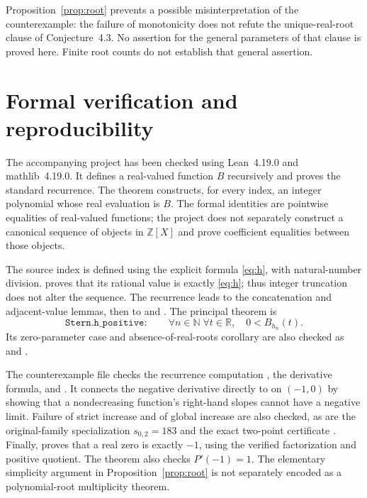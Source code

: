 \documentclass[11pt]{article}
\theoremstyle{remark}
\newcommand{\N}{\mathbb{N}}
\newcommand{\R}{\mathbb{R}}
\newcommand{\Z}{\mathbb{Z}}
\begin{document}
Proposition~\ref{prop:root} prevents a possible misinterpretation of the
counterexample: the failure of monotonicity does not refute the
unique-real-root clause of Conjecture~4.3. No assertion for the general
parameters of that clause is proved here. Finite root counts do not
establish that general assertion.

\section{Formal verification and reproducibility}
The accompanying project has been checked using Lean~4.19.0 and
mathlib~4.19.0. It defines a real-valued function $B$ recursively and
proves the standard recurrence. The theorem
 constructs, for every index,
an integer polynomial whose real evaluation is $B$.
The formal identities are pointwise equalities of real-valued functions;
the project does not separately construct a canonical sequence of objects
in $\Z[X]$ and prove coefficient equalities between those objects.

The source index is defined using the explicit formula
\eqref{eq:h}, with natural-number division.
 proves that its rational value is
exactly \eqref{eq:h}; thus integer truncation does not alter the sequence.
The recurrence leads to the concatenation and adjacent-value lemmas,
then to  and
.
The principal theorem is
\[
\texttt{Stern.h\_positive}:
\qquad \forall n\in\N\;\forall t\in\R,\quad 0<B_{h_n}(t).
\]
Its zero-parameter case and absence-of-real-roots corollary are also
checked as  and
.

The counterexample file checks the recurrence computation
, the derivative formula, and
.
It connects the negative derivative directly to
 on $(-1,0)$ by showing that a
nondecreasing function's right-hand slopes cannot have a negative limit.
Failure of strict increase and of global increase are also checked,
as are the original-family specialization $s_{0,2}=183$ and the exact
two-point certificate .
Finally,  proves that a real zero is
exactly $-1$, using the verified factorization and positive quotient.
The theorem  also checks $P'(-1)=1$.
The elementary simplicity argument in Proposition~\ref{prop:root}
is not separately encoded as a polynomial-root multiplicity theorem.
\end{document}
